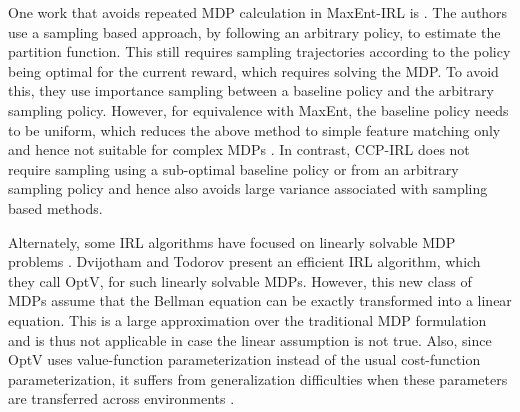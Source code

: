 \documentclass{article}
\begin{document}
One work that avoids repeated MDP calculation in MaxEnt-IRL is \cite{boularias2011relative}. The authors use a sampling based approach, by following an arbitrary policy, to estimate the partition function. This still requires sampling trajectories according to the policy being optimal for the current reward, which requires solving the MDP. To avoid this, they use importance sampling between a baseline policy and the arbitrary sampling policy. However, for equivalence with MaxEnt, the baseline policy needs to be uniform, which reduces the above method to simple feature matching only and hence not suitable for complex MDPs \cite{finn2016guided}. In contrast, CCP-IRL does not require sampling using a sub-optimal baseline policy or from an arbitrary sampling policy and hence also avoids large variance associated with sampling based methods.

Alternately, some IRL algorithms have focused on linearly solvable MDP problems \cite{todorov2007linearly}. Dvijotham and Todorov  present an efficient IRL algorithm, which they call OptV, for such linearly solvable MDPs. However, this new class of MDPs assume that the Bellman equation can be exactly transformed into a linear equation. This is a large approximation over the traditional MDP formulation and is thus not applicable in case the linear assumption is not true.
Also, since OptV uses value-function parameterization instead of the usual cost-function parameterization, it suffers from generalization difficulties when these parameters are transferred across environments \cite{ziebart_phd, levine2012continuous}.

\end{document}
